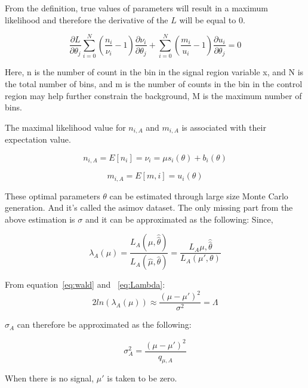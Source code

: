 From the definition, true values of parameters will result in a maximum likelihood and therefore the derivative of the ${L}$ will be equal to 0. 

\begin{equation}
\frac{\partial{L}}{\partial{\theta_{j}}} \sum_{i=0}^{N}(\frac{n_{i}}{\nu_{i}}-1) \frac{\partial{\nu_{i}}}{\partial{\theta_{j}}}+ \sum_{i=0}^{N}(\frac{m_{i}}{u_{i}}-1) \frac{\partial{u_{i}}}{\partial{\theta_{j}}} =  0 
\end{equation}

Here, n is the number of count in the bin in the signal region variable x, and N is the total number of bins, and m is the number of counts in the bin in the control region may help further constrain the background, M is the maximum number of bins. 

The maximal likelihood value for $n_{i,A}$ and $m_{i,A}$ is associated with their expectation value. 

\begin{equation}
    n_{i,A} = E[n_{i}] = \nu_{i} = \mu s_{i}(\theta) + b_{i}(\theta)
\end{equation}

\begin{equation}
    m_{i,A} = E[m,i] = u_{i}(\theta)
\end{equation}


These optimal parameters $\theta$ can be estimated through large size Monte Carlo generation. And it's called the asimov dataset.
The only missing part from the above estimation is $\sigma$ and it can be approximated as the following: 
Since, 

\begin{equation}
    \lambda_{A}(\mu) = \frac{L_{A}(\mu, \hat{\hat{\theta}})}{L_{A}(\hat{\mu}, \hat{\theta})}
= \frac{L_{A}{\mu, \hat{\hat{\theta}}}}{L_{A}(\mu', \theta)}
\end{equation}


From equation~\ref{eq:wald} and ~\ref{eq:Lambda}:
\begin{equation}
2ln(\lambda_{A}(\mu)) \approx \frac{(\mu-\mu')^{2}}{\sigma^{2}}=\Lambda
\end{equation}

$\sigma_{A}$ can therefore be approximated as the following:

\begin{equation}
    \sigma_{A}^{2} = \frac{(\mu-\mu')^{2}}{q_{\mu,A}}
\end{equation}

When there is no signal, $\mu'$ is taken to be zero. 


